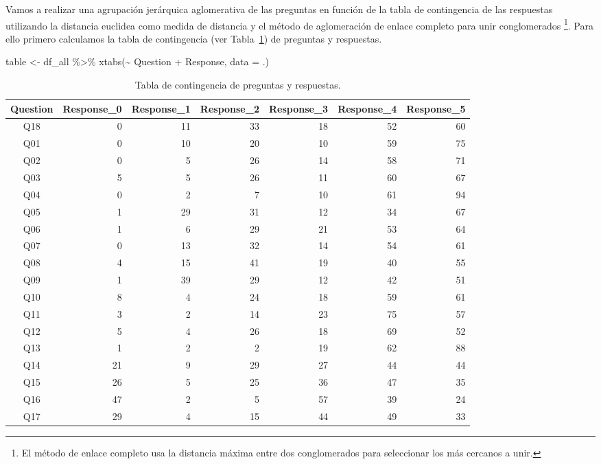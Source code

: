 \documentclass[
  12pt,
  a4paper,
  extrafontsizes,
  onecolumn,
  openright]{memoir}
\newenvironment{Shaded}{\begin{snugshade}}{\end{snugshade}}
\newcommand{\AttributeTok}[1]{\textcolor[rgb]{0.40,0.45,0.13}{#1}}
\newcommand{\FunctionTok}[1]{\textcolor[rgb]{0.28,0.35,0.67}{#1}}
\newcommand{\NormalTok}[1]{\textcolor[rgb]{0.00,0.23,0.31}{#1}}
\newcommand{\OtherTok}[1]{\textcolor[rgb]{0.00,0.23,0.31}{#1}}
\newcommand{\SpecialCharTok}[1]{\textcolor[rgb]{0.37,0.37,0.37}{#1}}
\begin{document}
Vamos a realizar una agrupación jerárquica aglomerativa de las preguntas
en función de la tabla de contingencia de las respuestas utilizando la
distancia euclidea como medida de distancia y el método de aglomeración
de enlace completo para unir conglomerados \footnote{El método de enlace
  completo usa la distancia máxima entre dos conglomerados para
  seleccionar los más cercanos a unir.}. Para ello primero calculamos la
tabla de contingencia (ver Tabla~\ref{tbl-contingencia}) de preguntas y
respuestas.

\begin{Shaded}
\begin{Highlighting}[]
\NormalTok{table }\OtherTok{\textless{}{-}}\NormalTok{ df\_all }\SpecialCharTok{\%\textgreater{}\%}
    \FunctionTok{xtabs}\NormalTok{(}\SpecialCharTok{\textasciitilde{}}\NormalTok{ Question }\SpecialCharTok{+}\NormalTok{ Response, }\AttributeTok{data =}\NormalTok{ .)}
\end{Highlighting}
\end{Shaded}

\scriptsize

\hypertarget{tbl-contingencia}{}
\begin{longtable}{crrrrrr}
\caption{\label{tbl-contingencia}Tabla de contingencia de preguntas y respuestas. }\tabularnewline

\toprule
Question & Response\_0 & Response\_1 & Response\_2 & Response\_3 & Response\_4 & Response\_5 \\ 
\midrule
Q18 & 0 & 11 & 33 & 18 & 52 & 60 \\ 
Q01 & 0 & 10 & 20 & 10 & 59 & 75 \\ 
Q02 & 0 & 5 & 26 & 14 & 58 & 71 \\ 
Q03 & 5 & 5 & 26 & 11 & 60 & 67 \\ 
Q04 & 0 & 2 & 7 & 10 & 61 & 94 \\ 
Q05 & 1 & 29 & 31 & 12 & 34 & 67 \\ 
Q06 & 1 & 6 & 29 & 21 & 53 & 64 \\ 
Q07 & 0 & 13 & 32 & 14 & 54 & 61 \\ 
Q08 & 4 & 15 & 41 & 19 & 40 & 55 \\ 
Q09 & 1 & 39 & 29 & 12 & 42 & 51 \\ 
Q10 & 8 & 4 & 24 & 18 & 59 & 61 \\ 
Q11 & 3 & 2 & 14 & 23 & 75 & 57 \\ 
Q12 & 5 & 4 & 26 & 18 & 69 & 52 \\ 
Q13 & 1 & 2 & 2 & 19 & 62 & 88 \\ 
Q14 & 21 & 9 & 29 & 27 & 44 & 44 \\ 
Q15 & 26 & 5 & 25 & 36 & 47 & 35 \\ 
Q16 & 47 & 2 & 5 & 57 & 39 & 24 \\ 
Q17 & 29 & 4 & 15 & 44 & 49 & 33 \\ 
\bottomrule
\end{longtable}
\end{document}
